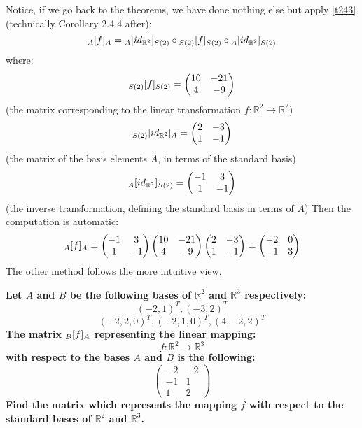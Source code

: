 \documentclass{exam}
\begin{document}
\begin{questions}
Notice, if we go back to the theorems, we have done nothing else but apply \eqref{t243} (technically Corollary 2.4.4 after):
\[
\cript{f}{A}{A} = \cript{id_{\mathbb{R}^2}}{A}{S(2)} \circ \cript{f}{S(2)}{S(2)} \circ \cript{id_{\mathbb{R}^2}}{A}{S(2)}
\]
where:
\[
\cript{f}{S(2)}{S(2)} = \begin{pmatrix}
10 & -21 \\
4 & -9
\end{pmatrix}
\]
(the matrix corresponding to the linear transformation $f : \mathbb{R}^2 \to \mathbb{R}^2$)
\[
\cript{id_{\mathbb{R}^2}}{S(2)}{A} = \begin{pmatrix}
2 & -3 \\
1 & -1
\end{pmatrix}
\]
(the matrix of the basis elements $A$, in terms of the standard basis)
\[
\cript{id_{\mathbb{R}^2}}{A}{S(2)} = \begin{pmatrix}
-1 & 3 \\
1 & -1
\end{pmatrix}
\]
(the inverse transformation, defining the standard basis in terms of $A$)
Then the computation is automatic:
\[
\cript{f}{A}{A} = \begin{pmatrix}
-1 & 3 \\
1 & -1
\end{pmatrix}
\begin{pmatrix}
10 & -21 \\
4 & -9
\end{pmatrix}
\begin{pmatrix}
2 & -3 \\
1 & -1
\end{pmatrix}
=
\begin{pmatrix}
-2 & 0 \\
-1 & 3
\end{pmatrix}
\]
The other method follows the more intuitive view.

\question \textbf{Let $A$ and $B$ be the following bases of $\mathbb{R}^2$ and $\mathbb{R}^3$ respectively:}
\[
(-2,1)^T, (-3,2)^T
\]
\[
(-2,2,0)^T, (-2,1,0)^T, (4,-2,2)^T
\]
\textbf{The matrix $\cript{f}{B}{A}$ representing the linear mapping:
\[
f : \mathbb{R}^2 \to \mathbb{R}^3
\]
with respect to the bases $A$ and $B$ is the following:
\[
\begin{pmatrix}
-2 & -2 \\
-1 & 1 \\
1 & 2
\end{pmatrix}
\]
Find the matrix which represents the mapping $f$ with respect to the standard bases of $\mathbb{R}^2$ and $\mathbb{R}^3$.} 


\end{questions}
\end{document}
